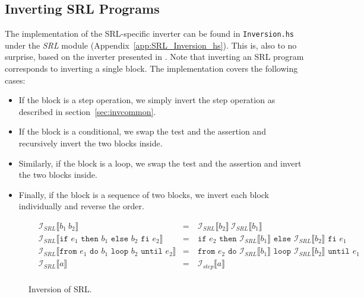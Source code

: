 \subsection{Inverting SRL Programs}

The implementation of the SRL-specific inverter can be found in \texttt{Inversion.hs} under the \textit{SRL} module (Appendix~\ref{app:SRL_Inversion_hs}). This is, also to no surprise, based on the inverter presented in \cite[Fig.~18]{REV}. Note that inverting an SRL program corresponds to inverting a single block. The implementation covers the following cases:

\begin{itemize}
  \item If the block is a step operation, we simply invert the step operation as described in section~\ref{sec:invcommon}.

  \item If the block is a conditional, we swap the test and the assertion and recursively invert the two blocks inside.

  \item Similarly, if the block is a loop, we swap the test and the assertion and invert the two blocks inside.

  \item Finally, if the block is a sequence of two blocks, we invert each block individually and reverse the order.
\end{itemize}

\begin{figure}[H]
  $$\begin{aligned}
    & \mathcal{I}_{SRL}\llbracket b_1\ b_2\rrbracket & =\ & \mathcal{I}_{SRL}\llbracket b_2\rrbracket\ \mathcal{I}_{SRL}\llbracket b_1\rrbracket\\
    & \mathcal{I}_{SRL}\llbracket\texttt{if }e_1\texttt{ then }b_1\texttt{ else }b_2\texttt{ fi }e_2\rrbracket & =\ &
      \texttt{if }e_2\texttt{ then }\mathcal{I}_{SRL}\llbracket b_1\rrbracket\texttt{ else }\mathcal{I}_{SRL}\llbracket b_2\rrbracket\texttt{ fi }e_1\\
    & \mathcal{I}_{SRL}\llbracket\texttt{from }e_1\texttt{ do }b_1\texttt{ loop }b_2\texttt{ until }e_2\rrbracket & =\ &
      \texttt{from }e_2\texttt{ do }\mathcal{I}_{SRL}\llbracket b_1\rrbracket\texttt{ loop }\mathcal{I}_{SRL}\llbracket b_2\rrbracket\texttt{ until }e_1\\
    & \mathcal{I}_{SRL}\llbracket a\rrbracket & =\ & \mathcal{I}_{step}\llbracket a\rrbracket\\
  \end{aligned}$$
  \caption{Inversion of SRL.}
  \label{fig:inversion_srl}
\end{figure}

